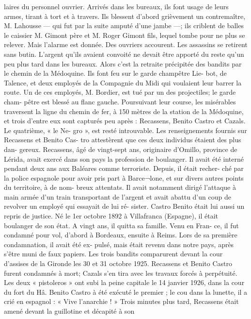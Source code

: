 \documentclass[a4paper,11pt]{book}
\begin{document}
laires du personnel ouvrier. Arrivés dans les bureaux, ils
font usage de leurs armes, tirant à tort et à travers. Ils
blessent d'abord grièvement un contremaître, M. Lahousse
— qui fut par la suite amputé d'une jambe —; ils criblent
de balles le caissier M. Gimont père et M. Roger Gimont
fils, lequel tombe pour ne plus se relever. Mais l'alarme est
donnée. Des ouvriers accourent. Les assassins se retirent
sans butin. L'argent qu'ils avaient convoité ne devait
être apporté du reste qu'un peu plus tard dans les bureaux.
Alors c'est la retraite précipitée des bandits par le chemin
de la Médoquine. Ils font feu sur le garde champêtre Lie-
bot, de Talence, et deux employés de la Compagnie du
Midi qui voulaient leur barrer la route. Un de ces employés,
M. Bordier, est tué par un des projectiles; le garde cham-
pêtre est blessé au flanc gauche.
Poursuivant leur course, les misérables traversent la
ligne du chemin de fer, à 150 mètres de la station de la
Médoquine, et trois d'entre eux sont capturés peu après :
Recassens, Benito Castro et Cazals. Le quatrième, « le Ne-
gro », est resté introuvable.
Les renseignements fournis sur Recassens et Benito Cas-
tro attestèrent que ces deux individus étaient des plus dan-
gereux. Recassens, âgé de vingt-sept ans, originaire
d'Omillo, province de Lérida, avait exercé dans son pays
la profession de boulanger. Il avait été interné pendant deux
ans aux Baléares comme terroriste. Depuis, il était recher-
ché par la police espagnole pour avoir pris part à Barce¬lone, et sur divers autres points du territoire, à de nom-
breux attentats. Il avait notamment dirigé l'attaque à main
armée d'un train transportant de l'argent et avait abattu
d'un coup de revolver un employé qui essayait de lui ré-
sister.
Castro Benito était lui aussi un repris de justice. Né le
1er octobre 1892 à Villafranca (Espagne), il était boulanger
de son état. A vingt ans, il quitta sa famille. Venu en Fran-
ce, il fut condamné pour vol, d'abord à Bordeaux, ensuite à
Reims. Lors de sa première condamnation, il avait été ex-
pulsé, mais était revenu dans notre pays, après s'être
muni de faux papiers.
Les trois bandits comparurent devant la cour d'assises
de la Gironde les 30 et 31 octobre 1925. Recassens et Benito
Castro furent condamnés à mort; Cazals s'en tira avec les
travaux forcés à perpétuité.
Les deux « pistoleros » ont subi la peine capitale le
14 janvier 1926, dans la cour du fort du Hâ. Benito Castro
à été exécuté le premier ; le cou dans la lunette, il a crié en
espagnol : « Vive l'anarchie ! » Trois minutes plus tard,
Recassens était amené devant la guillotine et décapité à son
\end{document}
